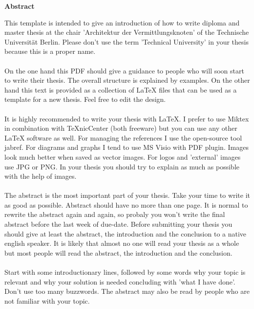 \thispagestyle{empty}
\vspace*{1.0cm}

\begin{center}
    \textbf{Abstract}
\end{center}

\vspace*{0.5cm}

\noindent
{}
This template is intended to give an introduction of how to write diploma and master thesis at the chair 'Architektur der Vermittlungsknoten' of the Technische Universität Berlin. Please don't use the term 'Technical University' in your thesis because this is a proper name. 
\\
\\
On the one hand this PDF should give a guidance to people who will soon start to write their thesis. The overall structure is explained by examples. On the other hand this text is provided as a collection of LaTeX files that can be used as a template for a new thesis. Feel free to edit the design.
\\
\\
It is highly recommended to write your thesis with LaTeX. I prefer to use Miktex in combination with TeXnicCenter (both freeware) but you can use any other LaTeX software as well. For managing the references I use the open-source tool jabref. For diagrams and graphs I tend to use MS Visio with PDF plugin. Images look much better when saved as vector images. For logos and 'external' images use JPG or PNG. In your thesis you should try to explain as much as possible with the help of images.
\\
\\
The abstract is the most important part of your thesis. Take your time to write it as good as possible. Abstract should have no more than one page. It is normal to rewrite the abstract again and again, so  probaly you won't write the final abstract before the last week of due-date. Before submitting your thesis you should give at least the abstract, the introduction and the conclusion to a native english speaker. It is likely that almost no one will read your thesis as a whole but most people will read the abstract, the introduction and the conclusion.
\\
\\
Start with some introductionary lines, followed by some words why your topic is relevant and why your solution is needed concluding with 'what I have done'. Don't use too many buzzwords. The abstract may also be read by people who are not familiar with your topic.